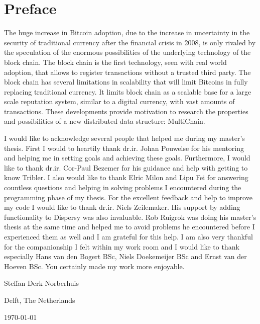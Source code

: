 \chapter*{Preface}
The huge increase in Bitcoin adoption, 
due to the increase in uncertainty in the security of traditional currency 
after the financial crisis in 2008, 
is only rivaled by the speculation of the enormous possibilities 
of the underlying technology of the block chain.
The block chain is the first technology, seen with real world adoption,
that allows to register transactions without a trusted third party.
The block chain has several limitations in scalability
that will limit Bitcoins in fully replacing traditional currency.
It limits block chain as a scalable base for a large scale reputation system,
similar to a digital currency, with vast amounts of transactions.
These developments provide motivation to research the properties and possibilities of a new distributed data structure:
MultiChain.

\vspace{1\baselineskip}

\noindent
I would like to acknowledge several people that helped me during my master's thesis.
First I would to heartily thank dr.ir. Johan Pouwelse for his mentoring and
helping me in setting goals and achieving these goals.
Furthermore, I would like to thank dr.ir. Cor-Paul Bezemer for his guidance and help with getting to know Tribler.
I also would like to thank Elric Milon and Lipu Fei for answering countless questions
and helping in solving problems I encountered during the programming phase of my thesis.
For the excellent feedback and help to improve my code I would like to thank dr.ir. Niels Zeilemaker.
His support by adding functionality to Dispersy was also invaluable.
Rob Ruigrok was doing his master's thesis at the same time
and helped me to avoid problems he encountered before I experienced them as well and
I am grateful for this help.
I am also very thankful for the companionship I felt within my work room 
and I would like to thank especially Hans van den Bogert BSc, Niels Doekemeijer BSc and Ernst van der Hoeven BSc.
You certainly made my work more enjoyable.

\vspace{1\baselineskip}

\noindent
Steffan Derk Norberhuis

\vspace{1\baselineskip}

\noindent
Delft, The Netherlands

\noindent
\today
